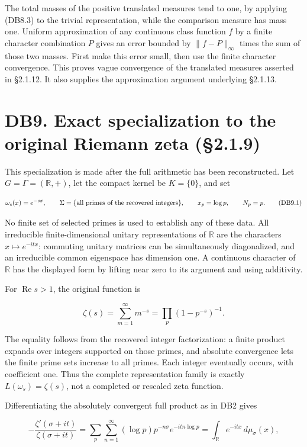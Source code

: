 \documentclass[
]{report}
\begin{document}
The total masses of the positive translated measures tend to one, by
applying (DB8.3) to the trivial representation, while the comparison
measure has mass one. Uniform approximation of any continuous class
function \(f\) by a finite character combination \(P\) gives an error
bounded by \(\|f-P\|_\infty\) times the sum of those two masses. First
make this error small, then use the finite character convergence. This
proves vague convergence of the translated measures asserted in §2.1.12.
It also supplies the approximation argument underlying §2.1.13.

\section{DB9. Exact specialization to the original Riemann zeta
(§2.1.9)}\label{db9.-exact-specialization-to-the-original-riemann-zeta-2.1.9}

This specialization is made after the full arithmetic has been
reconstructed. Let \(G=\Gamma=(\mathbb R,+)\), let the compact kernel be
\(K=\{0\}\), and set

\[
 \omega_s(x)=e^{-sx},\qquad
 \Sigma=\{\hbox{all primes of the recovered integers}\},\qquad
 x_p=\log p,\qquad N_p=p.
 \tag{DB9.1}
\]

No finite set of selected primes is used to establish any of these data.
All irreducible finite-dimensional unitary representations of
\(\mathbb R\) are the characters \(x\mapsto e^{-itx}\): commuting
unitary matrices can be simultaneously diagonalized, and an irreducible
common eigenspace has dimension one. A continuous character of
\(\mathbb R\) has the displayed form by lifting near zero to its
argument and using additivity.

For \(\operatorname{Re}s>1\), the original function is

\[
 \zeta(s)=\sum_{m=1}^{\infty}m^{-s}
         =\prod_{p}(1-p^{-s})^{-1}.
 \tag{DB9.2}
\]

The equality follows from the recovered integer factorization: a finite
product expands over integers supported on those primes, and absolute
convergence lets the finite prime sets increase to all primes. Each
integer eventually occurs, with coefficient one. Thus the complete
representation family is exactly \(L(\omega_s)=\zeta(s)\), not a
completed or rescaled zeta function.

Differentiating the absolutely convergent full product as in DB2 gives

\[
 -\frac{\zeta'(\sigma+it)}{\zeta(\sigma+it)}
  =\sum_{p}\sum_{n=1}^{\infty}
        (\log p)p^{-n\sigma}e^{-itn\log p}
  =\int_{\mathbb R}e^{-itx}\,d\mu_\sigma(x),
 \tag{DB9.3}
\]
\end{document}
